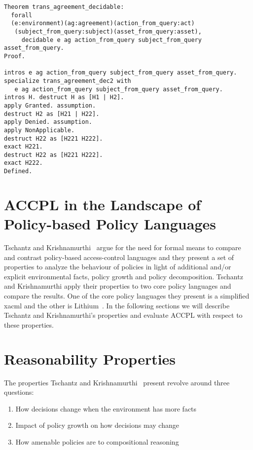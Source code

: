 \begin{lstlisting}
Theorem trans_agreement_decidable:
  forall
  (e:environment)(ag:agreement)(action_from_query:act)
   (subject_from_query:subject)(asset_from_query:asset),
     decidable e ag action_from_query subject_from_query asset_from_query.
Proof.

intros e ag action_from_query subject_from_query asset_from_query.
specialize trans_agreement_dec2 with 
   e ag action_from_query subject_from_query asset_from_query.
intros H. destruct H as [H1 | H2].
apply Granted. assumption.
destruct H2 as [H21 | H22].
apply Denied. assumption.
apply NonApplicable. 
destruct H22 as [H221 H222].
exact H221.
destruct H22 as [H221 H222].
exact H222.
Defined.

\end{lstlisting}

 
\section{ACCPL in the Landscape of Policy-based Policy Languages}

Tschantz and Krishnamurthi~\cite{Tschantz} argue for the need for formal means to compare and contrast policy-based access-control languages and they present a set of properties to analyze the behaviour of policies in light of additional and/or explicit environmental facts, policy growth and policy decomposition. Tschantz and Krishnamurthi apply their properties to two core policy languages and compare the results. One of the core policy languages they present is a simplified \ac{xacml} and the other is Lithium~\cite{Halpern2008}. In the following sections we will describe Tschantz and Krishnamurthi's properties and evaluate \ac{ACCPL} with respect to these properties.

\section{Reasonability Properties}\label{sec:threeinterpretations}

The properties Tschantz and Krishnamurthi~\cite{Tschantz} present revolve around three questions:

\begin{enumerate}
\item How decisions change when the environment has more facts
\item Impact of policy growth on how decisions may change
\item How amenable policies are to compositional reasoning
\end{enumerate}


